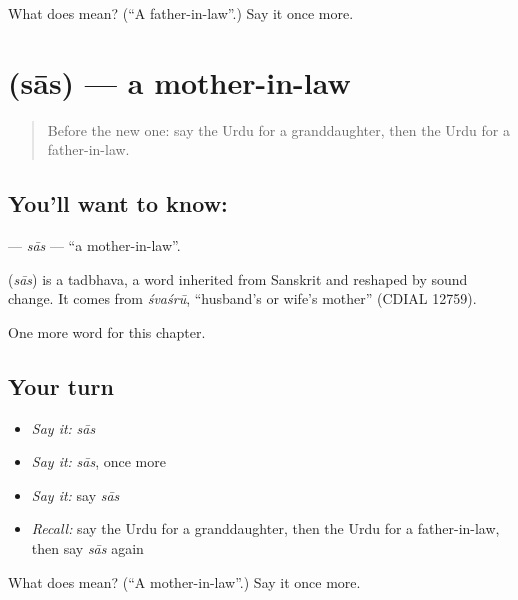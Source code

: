 \begin{tcolorbox}[breakable,colback=teal!4,colframe=teal!35!black,title={Before you move on}]
What does  mean? (\textquotedblleft{}A father-in-law\textquotedblright{}.) Say it once more.
\end{tcolorbox}
\section[\texorpdfstring{\ur{ساس} (sās)}{ساس (sās)}]{ (sās) — a mother-in-law}

\label{lesson:UR-C230-sas}



\begin{quote}
Before the new one: say the Urdu for a granddaughter, then the Urdu for a father-in-law.
\end{quote}

\subsection*{You'll want to know: }
\textbf{} — \emph{sās} — \textquotedblleft{}a mother-in-law\textquotedblright{}.

\begin{cousinweb}
\textbf{} (\emph{sās}) is a tadbhava, a word inherited from Sanskrit and reshaped by sound change. It comes from \emph{śvaśrū}, \textquotedblleft{}husband's or wife's mother\textquotedblright{} (CDIAL 12759).
\end{cousinweb}

\begin{grammarlens}[title={What you've built}]
One more word for this chapter.
\end{grammarlens}

\subsection*{Your turn}
\begin{itemize}
\raggedright
  \item \emph{Say it:} \emph{sās}
  \item \emph{Say it:} \emph{sās}, once more
  \item \emph{Say it:} say \emph{sās}
  \item \emph{Recall:} say the Urdu for a granddaughter, then the Urdu for a father-in-law, then say \emph{sās} again
\end{itemize}

\begin{tcolorbox}[breakable,colback=teal!4,colframe=teal!35!black,title={Before you move on}]
What does  mean? (\textquotedblleft{}A mother-in-law\textquotedblright{}.) Say it once more.
\end{tcolorbox}
